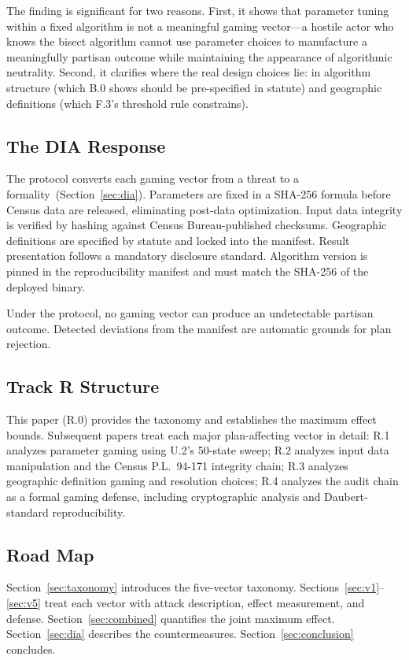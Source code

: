 The finding is significant for two reasons.
First, it shows that parameter tuning within a fixed algorithm is not a
meaningful gaming vector---a hostile actor who knows the bisect algorithm
cannot use parameter choices to manufacture a meaningfully partisan outcome
while maintaining the appearance of algorithmic neutrality.
Second, it clarifies where the real design choices lie: in algorithm structure
(which B.0 shows should be pre-specified in statute) and geographic definitions
(which F.3's threshold rule constrains).

\subsection{The DIA Response}

The \dia{} protocol converts each gaming vector from a threat to a
formality~(Section~\ref{sec:dia}).
Parameters are fixed in a SHA-256 formula before Census data are released,
eliminating post-data optimization.
Input data integrity is verified by hashing against Census Bureau-published
checksums.
Geographic definitions are specified by statute and locked into the manifest.
Result presentation follows a mandatory disclosure standard.
Algorithm version is pinned in the reproducibility manifest and must match
the SHA-256 of the deployed binary.

Under the \dia{} protocol, no gaming vector can produce an undetectable
partisan outcome.
Detected deviations from the manifest are automatic grounds for plan rejection.

\subsection{Track R Structure}

This paper (R.0) provides the taxonomy and establishes the maximum effect
bounds.
Subsequent papers treat each major plan-affecting vector in detail:
R.1 analyzes parameter gaming using U.2's 50-state sweep;
R.2 analyzes input data manipulation and the Census P.L.\ 94-171 integrity chain;
R.3 analyzes geographic definition gaming and resolution choices;
R.4 analyzes the audit chain as a formal gaming defense, including
cryptographic analysis and Daubert-standard reproducibility.

\subsection{Road Map}

Section~\ref{sec:taxonomy} introduces the five-vector taxonomy.
Sections~\ref{sec:v1}--\ref{sec:v5} treat each vector with attack
description, effect measurement, and defense.
Section~\ref{sec:combined} quantifies the joint maximum effect.
Section~\ref{sec:dia} describes the \dia{} countermeasures.
Section~\ref{sec:conclusion} concludes.
